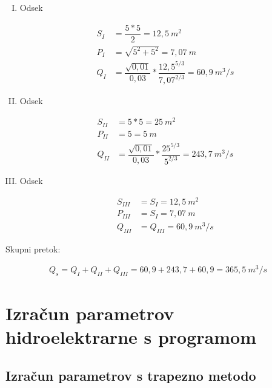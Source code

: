 \begin{enumerate}[I.]
	
	\item Odsek
	
	\begin{ceqn}
		\begin{align}
			S_I&=\dfrac{5 * 5}{2} = 12,5~m^2\\
			P_I&=\sqrt{5^2 + 5^2} = 7,07~m\\
			Q_I&=\dfrac{\sqrt{0,01}}{0,03} * \dfrac{12,5^{5/3}}{7,07^{2/3}} = 60,9~m^3/s
		\end{align}
	\end{ceqn}
		
	\item Odsek
	
	\begin{ceqn}
		\begin{align}
			S_{II}&=5*5 = 25 ~m^2\\
			P_{II}&=5 = 5~m\\
			Q_{II}&=\dfrac{\sqrt{0,01}}{0,03} * \dfrac{25^{5/3}}{5^{2/3}} = 243,7~m^3/s
		\end{align}
	\end{ceqn}
	
	\item Odsek
	\begin{ceqn}
		\begin{align}
		S_{III}&=S_{I} = 12,5~m^2\\
		P_{III}&=S_{I} = 7,07~m\\
		Q_{III}&=Q_{III} = 60,9~m^3/s
		\end{align}
	\end{ceqn}
	
\end{enumerate}

Skupni pretok:

\begin{ceqn}
 \begin{align}
Q_{s} = Q_{I} + Q_{II} + Q_{III} = 60,9 + 243,7 + 60,9 = 365,5~m^3/s
 \end{align}
 \end{ceqn}




\section{Izračun parametrov hidroelektrarne s programom}

\subsection{Izračun parametrov s trapezno metodo}


